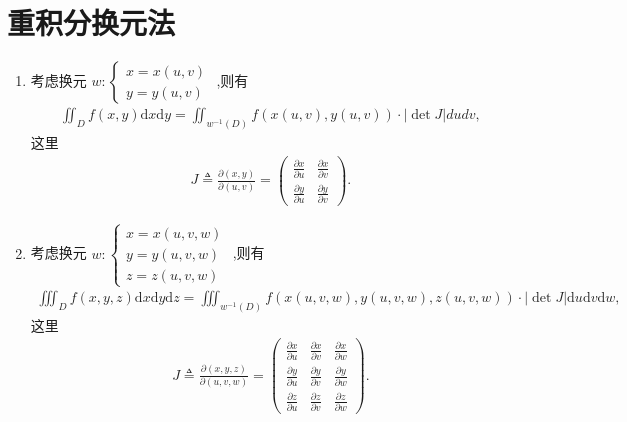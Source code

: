 \documentclass[../../main.tex]{subfiles}
\begin{document}
\section{重积分换元法}

\begin{theorem}[重积分换元法]\label{theorem:重积分换元法}
\begin{enumerate}
\item 考虑换元 $w:\begin{cases}x = x(u,v)\\y = y(u,v)\end{cases}$ ,则有
\begin{align*}
\iint_D f(x,y) \mathrm{d}x\mathrm{d}y= \iint_{w^{-1}(D)} f(x(u,v),y(u,v)) \cdot |\det J| dudv,
\end{align*}
这里
\begin{align*}
J \triangleq \frac{\partial(x,y)}{\partial(u,v)} = {\textstyle \begin{pmatrix}\frac{\partial x}{\partial u}&\frac{\partial x}{\partial v}\\\frac{\partial y}{\partial u}&\frac{\partial y}{\partial v}\end{pmatrix}}.
\end{align*}
\item 考虑换元 $w:\begin{cases}x = x(u,v,w)\\y = y(u,v,w)\\z = z(u,v,w)\end{cases}$ ,则有
\begin{align*}
\iiint_D f(x,y,z) \mathrm{d}x\mathrm{d}y\mathrm{d}z = \iiint_{w^{-1}(D)} f(x(u,v,w),y(u,v,w),z(u,v,w)) \cdot |\det J| \mathrm{d}u\mathrm{d}v\mathrm{d}w,
\end{align*}
这里
\begin{align*}
J \triangleq \frac{\partial(x,y,z)}{\partial(u,v,w)} = \begin{pmatrix}\frac{\partial x}{\partial u}&\frac{\partial x}{\partial v}&\frac{\partial x}{\partial w}\\\frac{\partial y}{\partial u}&\frac{\partial y}{\partial v}&\frac{\partial y}{\partial w}\\\frac{\partial z}{\partial u}&\frac{\partial z}{\partial v}&\frac{\partial z}{\partial w}\end{pmatrix}.
\end{align*}
\end{enumerate}
\end{theorem}
\end{document}
